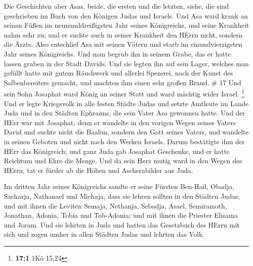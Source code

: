  Die Geschichten aber Asas, beide, die ersten und die
letzten, siehe, die sind geschrieben im Buch von den Königen Judas und
Israels.  Und Asa ward krank an seinen Füßen im
neununddreißigsten Jahr seines Königreichs, und seine Krankheit nahm
sehr zu; und er suchte auch in seiner Krankheit den HErrn nicht, sondern
die Ärzte.  Also entschlief Asa mit seinen Vätern und starb
im einundvierzigsten Jahr seines Königreichs.  Und man
begrub ihn in seinem Grabe, das er hatte lassen graben in der Stadt
Davids. Und sie legten ihn auf sein Lager, welches man gefüllt hatte mit
gutem Räuchwerk und allerlei Spezerei, nach der Kunst des
Salbenbereiters gemacht, und machten ihm einen sehr großen Brand. \# 17
 Und sein Sohn Josaphat ward König an seiner Statt und ward
mächtig wider Israel. \footnote{\textbf{17:1} 1Kö 15,24} 
Und er legte Kriegsvolk in alle festen Städte Judas und setzte Amtleute
im Lande Juda und in den Städten Ephraims, die sein Vater Asa gewonnen
hatte.  Und der HErr war mit Josaphat; denn er wandelte in
den vorigen Wegen seines Vaters David und suchte nicht die Baalim,
 sondern den Gott seines Vaters, und wandelte in seinen
Geboten und nicht nach den Werken Israels.  Darum bestätigte
ihm der HErr das Königreich; und ganz Juda gab Josaphat Geschenke, und
er hatte Reichtum und Ehre die Menge.  Und da sein Herz
mutig ward in den Wegen des HErrn, tat er fürder ab die Höhen und
Ascherabilder aus Juda.

 Im dritten Jahr seines Königreichs sandte er seine Fürsten
Ben-Hail, Obadja, Sacharja, Nathanael und Michaja, dass sie lehren
sollten in den Städten Judas;  und mit ihnen die Leviten
Semaja, Nethanja, Sebadja, Asael, Semiramoth, Jonathan, Adonia, Tobia
und Tob-Adonia; und mit ihnen die Priester Elisama und Joram.
 Und sie lehrten in Juda und hatten das Gesetzbuch des HErrn
mit sich und zogen umher in allen Städten Judas und lehrten das Volk.

